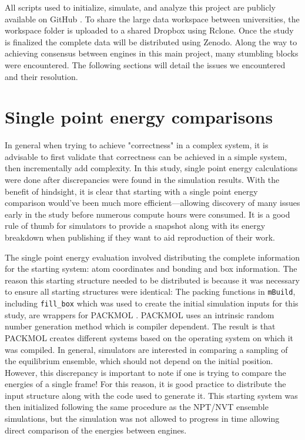 All scripts used to initialize, simulate, and analyze this project are publicly available on GitHub \citep{reproducibility}.
To share the large data workspace between universities, the workspace folder is uploaded to a shared Dropbox using Rclone. 
Once the study is finalized the complete data will be distributed using Zenodo.
Along the way to achieving consensus between engines in this main project, many stumbling blocks were encountered. 
The following sections will detail the issues we encountered and their resolution.

\section{Single point energy comparisons}

In general when trying to achieve "correctness" in a complex system, it is advisable to first validate that correctness can be achieved in a simple system, then incrementally add complexity.
In this study, single point energy calculations were done after discrepancies were found in the simulation results.
With the benefit of hindsight, it is clear that starting with a single point energy comparison would've been much more efficient---allowing discovery of many issues early in the study before numerous compute hours were consumed. 
It is a good rule of thumb for simulators to provide a snapshot along with its energy breakdown when publishing if they want to aid reproduction of their work.

The single point energy evaluation involved distributing the complete information for the starting system: atom coordinates and bonding and box information. 
The reason this starting structure needed to be distributed is because it was necessary to ensure all starting structures were identical:
The packing functions in \texttt{mBuild}, including \lstinline{fill_box} which was used to create the initial simulation inputs for this study, are wrappers for PACKMOL \citep{Martinez2003, Martinez2009}.
PACKMOL uses an intrinsic random number generation method which is compiler dependent. 
The result is that PACKMOL creates different systems based on the operating system on which it was compiled.
In general, simulators are interested in comparing a sampling of the equilibrium ensemble, which should not depend on the initial position.
However, this discrepancy is important to note if one is trying to compare the energies of a single frame!
For this reason, it is good practice to distribute the input structure along with the code used to generate it.
This starting system was then initialized following the same procedure as the NPT/NVT ensemble simulations, but the simulation was not allowed to progress in time allowing direct comparison of the energies between engines.

